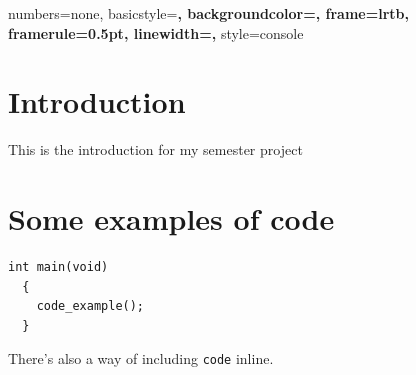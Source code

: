 
\newcommand{\expr}[1]{\og \emph{{#1}} \fg} %
\newcommand{\important}[1]{\textbf{#1}}
\newcommand{\code}[1]{\texttt{#1}}

\tableofcontents{}

\newpage

\lstset{language=C}
{
  numbers=none,
  basicstyle=\bf\ttfamily,
  backgroundcolor=\color{grey92},
  frame=lrtb,
  framerule=0.5pt,
  linewidth=\textwidth,
}
{
  style=console
}

\lstset{
  style=console
}



\section*{Introduction}
This is the introduction for my semester project

\section{Some examples of code}
\begin{lstlisting}[style=avr-c]
  int main(void)
  {
    code_example();
  }
\end{lstlisting}

There's also a way of including \code{code} inline.


